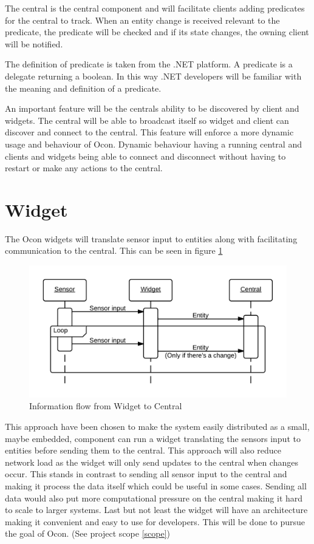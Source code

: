 \documentclass[../report.tex]{subfiles}
\begin{document}
The central is the central component and will facilitate clients adding predicates for the central to track. When an entity change is received relevant to the predicate, the predicate will be checked and if its state changes, the owning client will be notified.

The definition of predicate is taken from the .NET platform. A predicate is a delegate returning a boolean. In this way .NET developers will be familiar with the meaning and definition of a predicate.

An important feature will be the centrals ability to be discovered by client and widgets. The central will be able to broadcast itself so widget and client can discover and connect to the central. This feature will enforce a more dynamic usage and behaviour of Ocon. Dynamic behaviour having a running central and clients and widgets being able to connect and disconnect without having to restart or make any actions to the central.
 
\section{Widget}

The Ocon widgets will translate sensor input to entities along with facilitating communication to the central. This can be seen in figure \ref{seqwidget}

\begin{figure}[h]
\centering
\includegraphics[width=\linewidth]{sequencediagram-widget.png}
\caption{Information flow from Widget to Central}
\label{seqwidget}
\end{figure}

This approach have been chosen to make the system easily distributed as a small, maybe embedded, component can run a widget translating the sensors input to entities before sending them to the central. This approach will also reduce network load as the widget will only send updates to the central when changes occur. This stands in contrast to sending all sensor input to the central and making it process the data itself which could be useful in some cases. Sending all data would also put more computational pressure on the central making it hard to scale to larger systems. Last but not least the widget will have an architecture making it convenient and easy to use for developers. This will be done to pursue the goal of Ocon. (See project scope \ref{scope}) 
\end{document}
